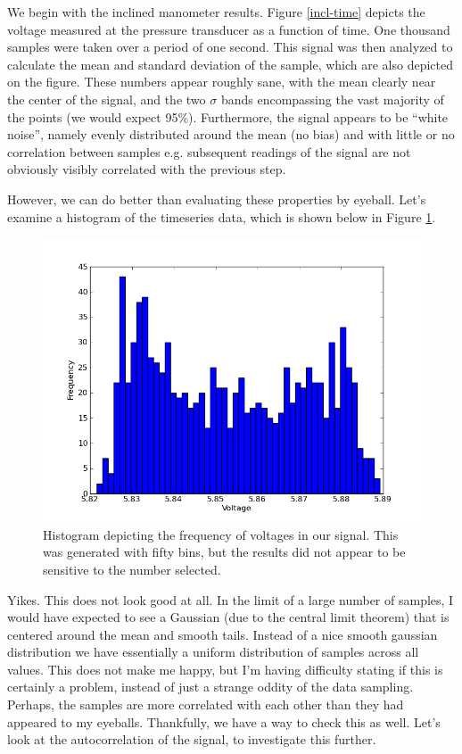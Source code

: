 \documentclass{article}
\begin{document}
We begin with the inclined manometer results. Figure \ref{incl-time}
depicts the voltage measured at the pressure transducer as a function of
time. One thousand samples were taken over a period of one second. This
signal was then analyzed to calculate the mean and standard deviation of
the sample, which are also depicted on the figure. These numbers appear
roughly sane, with the mean clearly near the center of the signal, and
the two $\sigma$ bands encompassing the vast majority of the points (we
would expect 95\%). Furthermore, the signal appears to be ``white
noise'', namely evenly distributed around the mean (no bias) and with
little or no correlation between samples e.g. subsequent readings of
the signal are not obviously visibly correlated with the previous step.

However, we can do better than evaluating these properties by
eyeball. Let's examine a histogram of the timeseries data, which is
shown below in Figure \ref{incl-hist}. 

  \begin{figure}[!htb]
   \begin{center}
    \includegraphics[width = 12 cm]{figs/incl_hist.png}
    \caption{Histogram depicting the frequency of voltages in our
    signal. This was generated with fifty bins, but the results did not
    appear to be sensitive to the number selected.}
    \label{incl-hist}
   \end{center}
  \end{figure}

Yikes. This does not look good at all. In the limit of a large number of
samples, I would have expected to see a Gaussian (due to the central
limit theorem) that is centered around the mean and smooth tails. 
Instead of a nice smooth gaussian distribution we have essentially a
uniform distribution of samples across all values. This does not make me
happy, but I'm having difficulty stating if this is certainly a problem,
instead of just a strange oddity of the data sampling. Perhaps, the
samples are more correlated with each other than they had appeared to my
eyeballs. Thankfully, we have a way to check this as well. Let's look at
the autocorrelation of the signal, to investigate this further. 
\end{document}

